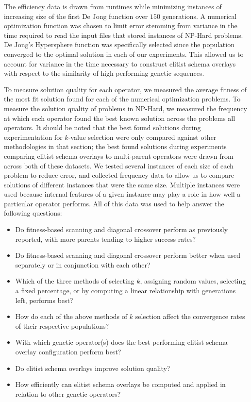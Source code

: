 The efficiency data is drawn from runtimes while minimizing instances of increasing size of the first De Jong function over $150$ generations. A numerical optimization function was chosen to limit error stemming from variance in the time required to read the input files that stored instances of NP-Hard problems. De Jong's Hypersphere function was specifically selected since the population converged to the optimal solution in each of our experiments. This allowed us to account for variance in the time necessary to construct elitist schema overlays with respect to the similarity of high performing genetic sequences.

To measure solution quality for each operator, we measured the average fitness of the most fit solution found for each of the numerical optimization problems. To measure the solution quality of problems in NP-Hard, we measured the frequency at which each operator found the best known solution across the problems all operators. It should be noted that the best found solutions during experimentation for $k$-value selection were only compared against other methodologies in that section; the best found solutions during experiments comparing elitist schema overlays to multi-parent operators were drawn from across both of these datasets. We tested several instances of each size of each problem to reduce error, and collected frequency data to allow us to compare solutions of different instances that were the same size. Multiple instances were used because internal features of a given instance may play a role in how well a particular operator performs. All of this data was used to help answer the following questions:

\begin{itemize}
\item Do fitness-based scanning and diagonal crossover perform as previously reported, with more parents tending to higher success rates?
\item Do fitness-based scanning and diagonal crossover perform better when used separately or in conjunction with each other? 
\item Which of the three methods of selecting $k$, assigning random values, selecting a fixed percentage, or by computing a linear relationship with generations left, performs best?
\item How do each of the above methods of $k$ selection affect the convergence rates of their respective populations?
\item With which genetic operator(s) does the best performing elitist schema overlay configuration perform best?
\item Do elitist schema overlays improve solution quality?
\item How efficiently can elitist schema overlays be computed and applied in relation to other genetic operators?
\end{itemize}

